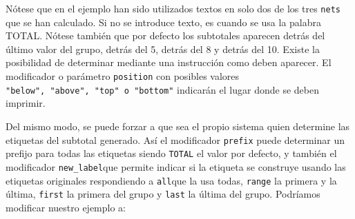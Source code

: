 \documentclass[
]{book}
\begin{document}
Nótese que en el ejemplo han sido utilizados textos en solo dos de los tres \texttt{nets} que se han calculado. Si no se introduce texto, es cuando se usa la palabra TOTAL. Nótese también que por defecto los subtotales aparecen detrás del último valor del grupo, detrás del 5, detrás del 8 y detrás del 10. Existe la posibilidad de determinar mediante una instrucción como deben aparecer. El modificador o parámetro \texttt{position} con posibles valores \texttt{"below",\ "above",\ "top"\ o\ "bottom"} indicarán el lugar donde se deben imprimir.

Del mismo modo, se puede forzar a que sea el propio sistema quien determine las etiquetas del subtotal generado. Así el modificador \texttt{prefix} puede determinar un prefijo para todas las etiquetas siendo \texttt{TOTAL} el valor por defecto, y también el modificador \texttt{new\_label}que permite indicar si la etiqueta se construye usando las etiquetas originales respondiendo a \texttt{all}que la usa todas, \texttt{range} la primera y la última, \texttt{first} la primera del grupo y \texttt{last} la última del grupo. Podríamos modificar nuestro ejemplo a:
\end{document}
